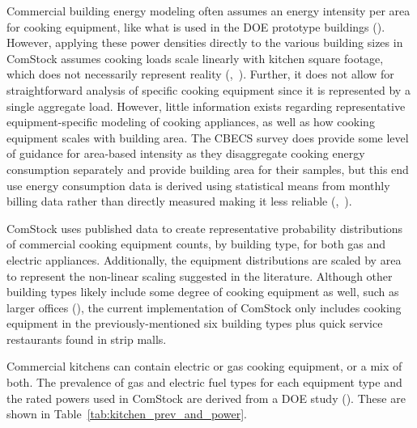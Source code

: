 

Commercial building energy modeling often assumes an energy intensity per area for cooking equipment, like what is used in the DOE prototype buildings (\cite{qsr_50pct_svs}). However, applying these power densities directly to the various building sizes in ComStock assumes cooking loads scale linearly with kitchen square footage, which does not necessarily represent reality (\cite{eia2012cbecs},~\cite{qsr_50pct_svs}). Further, it does not allow for straightforward analysis of specific cooking equipment since it is represented by a single aggregate load. However, little information exists regarding representative equipment-specific modeling of cooking appliances, as well as how cooking equipment scales with building area. The CBECS survey does provide some level of guidance for area-based intensity as they disaggregate cooking energy consumption separately and provide building area for their samples, but this end use energy consumption data is derived using statistical means from monthly billing data rather than directly measured making it less reliable (\cite{eia2012cbecs},~\cite{qsr_50pct_svs}).


ComStock uses published data to create representative probability distributions of commercial cooking equipment counts, by building type, for both gas and electric appliances. Additionally, the equipment distributions are scaled by area to represent the non-linear scaling suggested in the literature. Although other building types likely include some degree of cooking equipment as well, such as larger offices (\cite{eia2012cbecs}), the current implementation of ComStock only includes cooking equipment in the previously-mentioned six building types plus quick service restaurants found in strip malls. 

Commercial kitchens can contain electric or gas cooking equipment, or a mix of both. The prevalence of gas and electric fuel types for each equipment type and the rated powers used in ComStock are derived from a DOE study (\cite{goetzler_commercial_appliances}). These are shown in Table~\ref{tab:kitchen_prev_and_power}. 



